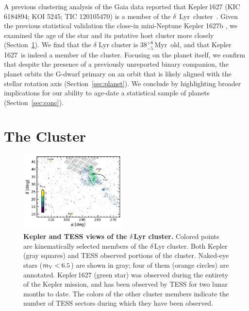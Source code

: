 \documentclass[12pt,modern,twocolumn,tighten]{aastex63}
\newcommand{\cn}{$\delta$\ Lyr\ cluster} %
\newcommand{\sn}{Kepler\,1627} %
\newcommand{\clusterage}{$38^{+6}_{-5}$\,Myr} %
\begin{document}
A previous clustering analysis of the Gaia data reported that
Kepler\,1627 (KIC 6184894; KOI 5245; TIC 120105470) is a member of the
\cn\ \citep{kounkel_untangling_2019}.  Given the previous statistical
validation the close-in mini-Neptune Kepler 1627b
\citep{2012ApJS..199...24T,morton_false_2016,thompson_planetary_2018},
we examined the age of the star and its putative host cluster more
closely (Section~\ref{sec:cluster}).  We find that the $\delta$ Lyr
cluster is \clusterage\ old, and that \sn\ is indeed a member of the
cluster.  Focusing on the planet itself, we confirm that despite the
presence of a previously unreported binary companion, the planet
orbits the G-dwarf primary on an orbit that is likely aligned with the
stellar rotation axis (Section~\ref{sec:planet}).  We conclude by
highlighting broader implications for our ability to age-date a
statistical sample of planets (Section~\ref{sec:conc}).


\section{The Cluster}
\label{sec:cluster}

\begin{figure}[t]
	\begin{center}
		\leavevmode
		\includegraphics[width=0.48\textwidth]{f2.pdf}
	\end{center}
	\vspace{-0.7cm}
	\caption{
    {\bf Kepler and TESS views of the $\delta$\,Lyr cluster.} Colored
    points are kinematically selected members of the $\delta$\,Lyr
    cluster.  Both Kepler (gray squares) and TESS observed portions of
    the cluster.  Naked-eye stars ($m_{\rm V}<6.5$) are shown in gray;
    four of them (orange circles) are annotated.
    Kepler\,1627 (green star) was observed during the entirety of the
    Kepler mission, and has been observed by TESS for two lunar months
    to date.  The colors of the other cluster members indicate the
    number of TESS sectors during which they have been observed.
    \label{fig:skychart}
	}
\end{figure}
\end{document}
